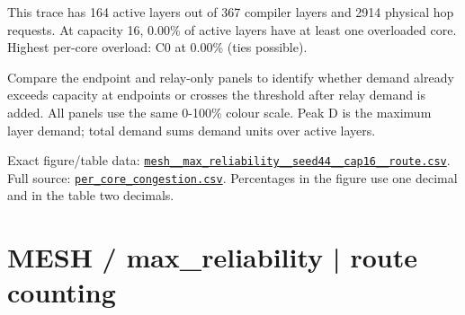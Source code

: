 \documentclass[10pt,a4paper]{article}
\begin{document}
This trace has 164 active layers out of 367 compiler layers and 2914 physical hop requests. At capacity 16, 0.00\% of active layers have at least one overloaded core. Highest per-core overload: C0 at 0.00\% (ties possible).\par
Compare the endpoint and relay-only panels to identify whether demand already exceeds capacity at endpoints or crosses the threshold after relay demand is added. All panels use the same 0-100\% colour scale. Peak D is the maximum layer demand; total demand sums demand units over active layers.\par
Exact figure/table data: \href{\detokenize{file:///home/dhruv-pansuriya/Documents/BTP/Compiler-Driven-ACE/output/pdf/qaoa_methods_congestion/tables/mesh__max_reliability__seed44__cap16__route.csv}}{\nolinkurl{mesh__max_reliability__seed44__cap16__route.csv}}. Full source: \href{\detokenize{file:///home/dhruv-pansuriya/Documents/BTP/Compiler-Driven-ACE/results/qaoa_2seed_2026-10-26/congestion/per_core_congestion.csv}}{\nolinkurl{per_core_congestion.csv}}. Percentages in the figure use one decimal and in the table two decimals.\par
\clearpage
\section*{MESH / max\_reliability | route counting}
\end{document}
